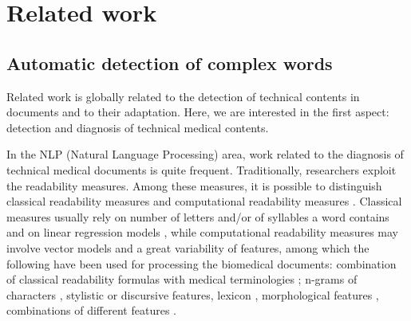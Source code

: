 \chapter{Related work}
\label{ch:related-work}

\section{Automatic detection of complex words}
Related work is globally related to the detection of technical contents in documents and to their adaptation. Here, we are interested in the first aspect: detection and diagnosis of technical medical contents. 

In the NLP (Natural Language Processing) area, work related to the diagnosis of technical medical documents is quite frequent. Traditionally, researchers exploit the readability measures. Among these measures, it is possible to distinguish classical readability measures and computational readability measures \citep{Francois-TAL2013}. Classical measures usually rely on number of letters and/or of syllables a word contains and on linear regression models \citep{Flesch1948,Gunning1973}, while computational readability
measures may involve vector models and a great variability of
features, among which the following have been used for processing the
biomedical documents: combination of classical readability formulas
with medical terminologies \citep{Kokkinakis-2006}; n-grams of
characters \citep{Poprat-MIE2006}, stylistic \citep{Grabar-AMIA2007} or
discursive \citep{Goeuriot-LREC2008} features, lexicon
\citep{Miller-HICSS2007}, morphological features
\citep{Chmielik-TAL2011}, combinations of different features
\citep{Zeng-MEDINFO2007}.

